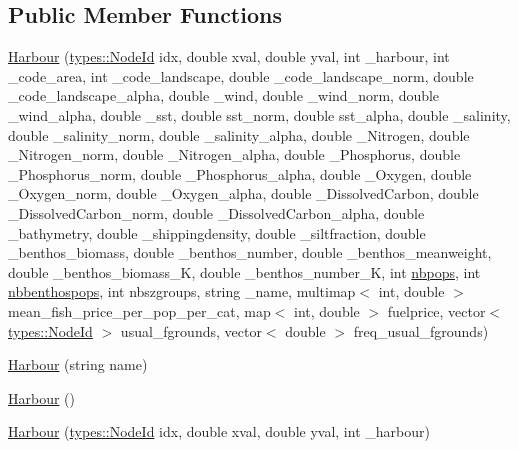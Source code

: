 \subsection*{Public Member Functions}
\begin{DoxyCompactItemize}
\item 
\mbox{\hyperlink{class_harbour_ad6115cf7a5ec4a65e985a1db5a1f4bd2}{Harbour}} (\mbox{\hyperlink{classtypes_1_1_node_id}{types\+::\+Node\+Id}} idx, double xval, double yval, int \+\_\+harbour, int \+\_\+code\+\_\+area, int \+\_\+code\+\_\+landscape, double \+\_\+code\+\_\+landscape\+\_\+norm, double \+\_\+code\+\_\+landscape\+\_\+alpha, double \+\_\+wind, double \+\_\+wind\+\_\+norm, double \+\_\+wind\+\_\+alpha, double \+\_\+sst, double sst\+\_\+norm, double sst\+\_\+alpha, double \+\_\+salinity, double \+\_\+salinity\+\_\+norm, double \+\_\+salinity\+\_\+alpha, double \+\_\+\+Nitrogen, double \+\_\+\+Nitrogen\+\_\+norm, double \+\_\+\+Nitrogen\+\_\+alpha, double \+\_\+\+Phosphorus, double \+\_\+\+Phosphorus\+\_\+norm, double \+\_\+\+Phosphorus\+\_\+alpha, double \+\_\+\+Oxygen, double \+\_\+\+Oxygen\+\_\+norm, double \+\_\+\+Oxygen\+\_\+alpha, double \+\_\+\+Dissolved\+Carbon, double \+\_\+\+Dissolved\+Carbon\+\_\+norm, double \+\_\+\+Dissolved\+Carbon\+\_\+alpha, double \+\_\+bathymetry, double \+\_\+shippingdensity, double \+\_\+siltfraction, double \+\_\+benthos\+\_\+biomass, double \+\_\+benthos\+\_\+number, double \+\_\+benthos\+\_\+meanweight, double \+\_\+benthos\+\_\+biomass\+\_\+K, double \+\_\+benthos\+\_\+number\+\_\+K, int \mbox{\hyperlink{thread__vessels_8cpp_a664e1cfcbba8af93cd65eaeb74e3b3a5}{nbpops}}, int \mbox{\hyperlink{simulator_2main_8cpp_a18da12a1dce03dc746278b124588e10e}{nbbenthospops}}, int nbszgroups, string \+\_\+name, multimap$<$ int, double $>$ mean\+\_\+fish\+\_\+price\+\_\+per\+\_\+pop\+\_\+per\+\_\+cat, map$<$ int, double $>$ fuelprice, vector$<$ \mbox{\hyperlink{classtypes_1_1_node_id}{types\+::\+Node\+Id}} $>$ usual\+\_\+fgrounds, vector$<$ double $>$ freq\+\_\+usual\+\_\+fgrounds)
\item 
\mbox{\hyperlink{class_harbour_a2e526fb42b7f9efd9ee251541dd4421c}{Harbour}} (string name)
\item 
\mbox{\hyperlink{class_harbour_a12bda3056657fe243a6bc99e8b25cdc4}{Harbour}} ()
\item 
\mbox{\hyperlink{class_harbour_a52ae85599c7013293bb30a7ab13df69a}{Harbour}} (\mbox{\hyperlink{classtypes_1_1_node_id}{types\+::\+Node\+Id}} idx, double xval, double yval, int \+\_\+harbour)
\item 

\end{DoxyCompactItemize}
